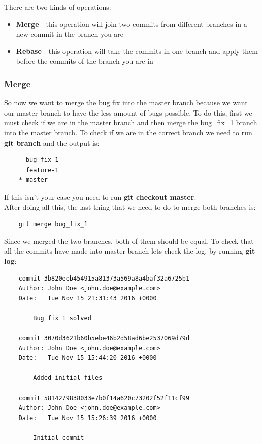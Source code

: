 \documentclass{article}
\begin{document}
There are two kinds of operations: 

\begin{itemize}
	\item{\textbf{Merge} - this operation will join two commits from different branches in a new commit in the branch you are}
	\item{\textbf{Rebase} - this operation will take the commits in one branch and apply them before the commits of the branch you are in}
\end{itemize}

\subsubsection{Merge}

So now we want to merge the bug fix into the master branch because we want our master branch to have the less amount of bugs possible. To do this, first we must check if we are in the master branch and then merge the bug\_fix\_1 branch into the master branch. To check if we are in the correct branch we need to run \textbf{git branch} and the output is:

\begin{lstlisting}
	  bug_fix_1
	  feature-1
	* master
\end{lstlisting}

If this isn't your case you need to run \textbf{git checkout master}.\\

After doing all this, the last thing that we need to do to merge both branches is:

\begin{lstlisting}
	git merge bug_fix_1
\end{lstlisting}

Since we merged the two branches, both of them should be equal. To check that all the commits have made into master branch lets check the log, by running \textbf{git log}:

\begin{lstlisting}
	commit 3b820eeb454915a81373a569a8a4baf32a6725b1
	Author: John Doe <john.doe@example.com>
	Date:   Tue Nov 15 21:31:43 2016 +0000

    	Bug fix 1 solved

	commit 3070d3621b60b5ebe46b2d58ad6be2537069d79d
	Author: John Doe <john.doe@example.com>
	Date:   Tue Nov 15 15:44:20 2016 +0000

    	Added initial files

	commit 5814279838033e7b0f14a620c73202f52f11cf99
	Author: John Doe <john.doe@example.com>
	Date:   Tue Nov 15 15:26:39 2016 +0000

    	Initial commit
\end{lstlisting}
\end{document}
